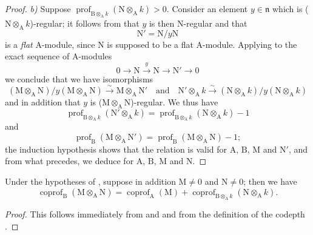 \begin{proof}
\emph{b)} Suppose $\operatorname{prof}_{\mathrm{B}\otimes_\mathrm{A} k}(\mathrm{N}\otimes_\mathrm{A} k)>0$.
Consider an element $y\in\mathfrak{n}$ which is ($\mathrm{N}\otimes_\mathrm{A} k$)-regular; it follows from  that $y$ is then N-regular and that
\[
  \mathrm{N}'=\mathrm{N}/y\mathrm{N}
\]
is a \emph{flat} $\mathrm{A}$-module, since $\mathrm{N}$ is supposed to be a flat $\mathrm{A}$-module.
Applying  to the exact sequence of $\mathrm{A}$-modules
\[
  0\to\mathrm{N}\xrightarrow{y}\mathrm{N}\to\mathrm{N}'\to 0
\]
we conclude that we have isomorphisms
\[
  (\mathrm{M}\otimes_\mathrm{A}\mathrm{N})/y(\mathrm{M}\otimes_\mathrm{A}\mathrm{N})\xrightarrow{\sim}\mathrm{M}\otimes_\mathrm{A}\mathrm{N}' \quad\text{and}\quad \mathrm{N}'\otimes_\mathrm{A} k\xrightarrow{\sim}(\mathrm{N}\otimes_\mathrm{A} k)/y(\mathrm{N}\otimes_\mathrm{A} k)
\]
and in addition that $y$ is ($\mathrm{M}\otimes_\mathrm{A}\mathrm{N}$)-regular.
We thus have
\[
  \operatorname{prof}_{\mathrm{B}\otimes_\mathrm{A} k}(\mathrm{N}'\otimes_\mathrm{A} k)=\operatorname{prof}_{\mathrm{B}\otimes_\mathrm{A} k}(\mathrm{N}\otimes_\mathrm{A} k)-1
\]
and
\[
  \operatorname{prof}_\mathrm{B}(\mathrm{M}\otimes_\mathrm{A}\mathrm{N}')=\operatorname{prof}_\mathrm{B}(\mathrm{M}\otimes_\mathrm{A}\mathrm{N})-1;
\]
the induction hypothesis shows that the relation  is valid for $\mathrm{A}$, $\mathrm{B}$, $\mathrm{M}$ and $\mathrm{N}'$, and from what precedes, we deduce  for $\mathrm{A}$, $\mathrm{B}$, $\mathrm{M}$ and $\mathrm{N}$.
\end{proof}

\begin{corollary}[6.3.2]
\label{IV.6.3.2}
Under the hypotheses of , suppose in addition $\mathrm{M}\neq 0$ and $\mathrm{N}\neq 0$; then we have
\begin{equation}
  \operatorname{coprof}_\mathrm{B}(\mathrm{M}\otimes_\mathrm{A}\mathrm{N})=\operatorname{coprof}_\mathrm{A}(\mathrm{M})+\operatorname{coprof}_{\mathrm{B}\otimes_\mathrm{A} k}(\mathrm{N}\otimes_\mathrm{A} k).
  \label{IV.6.3.2.1}
\tag{6.3.2.1}
\end{equation}
\end{corollary}

\begin{proof}
This follows immediately from  and  and from the definition of the codepth .
\end{proof}

